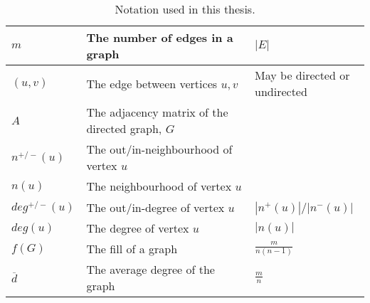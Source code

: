 \begin{table}
\begin{adjustwidth}{-0.75in}{-0.75in}
\begin{tabular}{ |p{2cm}|p{6cm}|p{5cm}|  }
            $m$              & The number of edges in a graph                                                                                      & $|E|$                   \\
            \hline

            $(u, v)$         & The edge between vertices $u, v$                                                                                    & May be directed or undirected \\
            \hline

            $A$              & The adjacency matrix of the directed graph, $G$                                                                     &                               \\
            \hline
            $n^{+/-}(u)$       & The out/in-neighbourhood of vertex $u$                                                                                 &                               \\
            \hline
            $n(u)$       & The neighbourhood of vertex $u$                                                                                  &                               \\
            \hline
            $deg^{+/-}(u)$     & The out/in-degree of vertex $u$ & $|n^{+}(u)|$/$|n^{-}(u)| $           \\
            \hline
            $deg(u)$     & The degree of vertex $u$   & $|n(u)|$            \\
            \hline
            $f(G)$     & The fill of a graph & $\frac{m}{n(n-1)}$            \\
            \hline
            $\overline{d}$ & The average degree of the graph & $\frac{m}{n}$            \\
            \hline
        \end{tabular}
        \caption{\label{tab:notation}Notation used in this thesis.}
    \end{adjustwidth}
\end{table}


